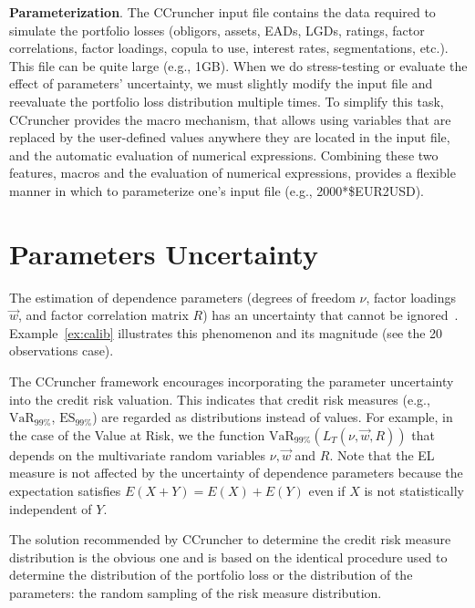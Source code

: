 \documentclass[11pt,fleqn]{book} %
\begin{document}
\textbf{Parameterization}. 
The CCruncher input file contains the data required to simulate the portfolio
losses (obligors, assets, EADs, LGDs, ratings, factor correlations, factor
loadings, copula to use, interest rates, segmentations, etc.). This file can 
be quite large (e.g., 1GB). When we do stress-testing or evaluate the effect 
of parameters' uncertainty, we must slightly modify the input file and 
reevaluate the portfolio loss distribution multiple times. To simplify this 
task, CCruncher provides the macro mechanism, that allows using variables 
that are replaced by the user-defined values anywhere they are located in 
the input file, and the automatic evaluation of numerical expressions. 
Combining these two features, macros and the evaluation of numerical 
expressions, provides a flexible manner in which to parameterize one's input 
file (e.g., 2000*\$EUR2USD). 

\section{Parameters Uncertainty}

The estimation of dependence parameters (degrees of freedom $\nu$, factor
loadings $\vec{w}$, and factor correlation matrix $R$) has an uncertainty 
that cannot be ignored~\cite{tarashev:2010,gossl:2005}. Example~\ref{ex:calib} 
illustrates this phenomenon and its magnitude (see the 20 observations case).

The CCruncher framework encourages incorporating the parameter uncertainty 
into the credit risk valuation. This indicates that credit risk measures
(e.g., $\text{VaR}_{99\%}$, $\text{ES}_{99\%}$) are regarded as distributions 
instead of values. For example, in the case of the Value at Risk, we 
the function $\text{VaR}_{99\%}(L_T(\nu,\vec{w},R))$ that depends on 
the multivariate random variables $\nu, \vec{w}$ and $R$.
Note that the EL measure is not affected by the uncertainty of dependence 
parameters because the expectation satisfies $E(X+Y)=E(X)+E(Y)$ even if $X$ 
is not statistically independent of $Y$.

The solution recommended by CCruncher to determine the credit risk measure 
distribution is the obvious one and is based on the identical procedure 
used to determine the distribution of the portfolio loss or the distribution 
of the parameters: the random sampling of the risk measure distribution. 
\end{document}
